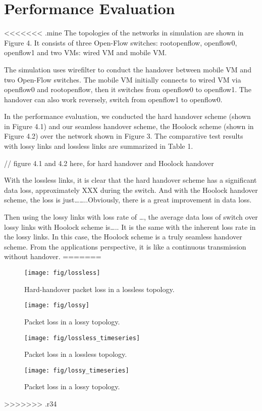 \section{Performance Evaluation} \label{eval}

<<<<<<< .mine
The topologies of the networks in simulation are shown in Figure 4. It consists of three Open-Flow switches: rootopenflow, openflow0, openflow1 and two VMs: wired VM and mobile VM.

The simulation uses wirefilter to conduct the handover between mobile VM and two Open-Flow switches. The mobile VM initially connects to wired VM via openflow0 and rootopenflow, then it switches from openflow0 to openflow1. The handover can also work reversely, switch from openflow1 to openflow0.

In the performance evaluation, we conducted the hard handover scheme (shown in Figure 4.1) and our seamless handover scheme, the Hoolock scheme (shown in Figure 4.2) over the network shown in Figure 3. The comparative test results with lossy links and lossless links are summarized in Table 1.

// figure 4.1 and 4.2 here, for hard handover and Hoolock handover

With the lossless links, it is clear that the hard handover scheme has a significant data loss, approximately XXX during the switch. And with the Hoolock handover scheme, the loss is just……..Obviously, there is a great improvement in data loss.

Then using the lossy links with loss rate of …, the average data loss of switch over lossy links with Hoolock scheme is….. It is the same with the inherent loss rate in the lossy links. In this case, the Hoolock scheme is a truly seamless handover scheme. From the applications perspective, it is like a continuous transmission without handover.
=======
\begin{figure}[h]
\centerline{\texttt{[image: fig/lossless]}}
\caption{Hard-handover packet loss in a lossless topology.}
\label{fig:lossless}
\end{figure}

\begin{figure}[h]
\centerline{\texttt{[image: fig/lossy]}}
\caption{Packet loss in a lossy topology.}
\label{fig:lossy}
\end{figure}

\begin{figure}[h]
\centerline{\texttt{[image: fig/lossless\_timeseries]}}
\caption{Packet loss in a lossless topology.}
\label{fig:lossless_ts}
\end{figure}

\begin{figure}[h]
\centerline{\texttt{[image: fig/lossy\_timeseries]}}
\caption{Packet loss in a lossy topology.}
\label{fig:lossy_ts}
\end{figure}

>>>>>>> .r34
